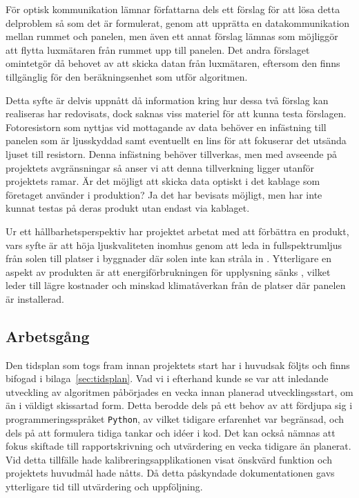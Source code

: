         För optisk kommunikation lämnar författarna dels ett förslag för att lösa detta delproblem så som det är formulerat, genom att upprätta en datakommunikation mellan rummet och panelen, men även ett annat förslag lämnas som möjliggör att flytta luxmätaren från rummet upp till panelen. Det andra förslaget omintetgör då behovet av att skicka datan från luxmätaren, eftersom den finns tillgänglig för den beräkningsenhet som utför algoritmen.\bigskip

        Detta syfte är delvis uppnått då information kring hur dessa två förslag kan realiseras har redovisats, dock saknas viss materiel för att kunna testa förslagen. Fotoresistorn som nyttjas vid mottagande av data behöver en infästning till panelen som är ljusskyddad samt eventuellt en lins för att fokuserar det utsända ljuset till resistorn. Denna infästning behöver tillverkas, men med avseende på projektets avgränsningar så anser vi att denna tillverkning ligger utanför projektets ramar. Är det möjligt att skicka data optiskt i det kablage som företaget använder i produktion? Ja det har bevisats möjligt, men har inte kunnat testas på deras produkt utan endast via kablaget.\bigskip

        Ur ett hållbarhetsperspektiv har projektet arbetat med att förbättra en produkt, vars syfte är att höja ljuskvaliteten inomhus genom att leda in fullspektrumljus från solen till platser i byggnader där solen inte kan stråla in \cite{quality}. Ytterligare en aspekt av produkten är att energiförbrukningen för upplysning sänks \cite{panel_energy}, vilket leder till lägre kostnader och minskad klimatåverkan från de platser där panelen är installerad. 


    \subsection{Arbetsgång} %
    \label{sub:arbetsg_ng}
        Den tidsplan som togs fram innan projektets start har i huvudsak följts och finns bifogad i bilaga~\ref{sec:tidsplan}. Vad vi i efterhand kunde se var att inledande utveckling av algoritmen påbörjades en vecka innan planerad utvecklingsstart, om än i väldigt skissartad form. Detta berodde dels på ett behov av att fördjupa sig i programmeringsspråket \texttt{Python}, av vilket tidigare erfarenhet var begränsad, och dels på att formulera tidiga tankar och idéer i kod. Det kan också nämnas att fokus skiftade till rapportskrivning och utvärdering en vecka tidigare än planerat. Vid detta tillfälle hade kalibreringsapplikationen visat önskvärd funktion och projektets huvudmål hade nåtts. Då detta påskyndade dokumentationen gavs ytterligare tid till utvärdering och uppföljning.\bigskip

